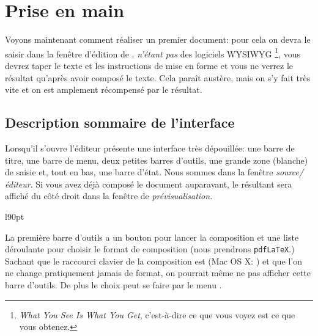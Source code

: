 
\chapter{Prise en main}
\label{chap:first-steps}

Voyons maintenant comment réaliser un premier document: pour cela on devra le saisir dans la fenêtre d'édition de \Tw{}. \AllTeX{} \emph{n'étant pas} des logiciels WYSIWYG \footnote{\emph{What You See Is What You Get}, c'est-à-dire \og ce que vous voyez est ce que vous obtenez\fg.}, vous devrez taper le texte et les instructions de mise en forme et vous ne verrez le résultat qu'après avoir \og composé\fg{} le texte. Cela paraît austère, mais on s'y fait très vite et on est amplement récompensé par le résultat.

\section{Description sommaire de l'interface}

\newsavebox{\inlineimg}

Lorsqu'il s'ouvre l'éditeur présente une interface très dépouillée: une barre de titre, une barre de menu, deux petites barres d'outils, une grande zone (blanche) de saisie et, tout en bas, une barre d'état. Nous sommes dans la fenêtre \emph{source/éditeur}. Si vous avez déjà composé le document auparavant, le  résultant sera affiché du côté droit dans la fenêtre de \emph{prévisualisation.}
\vspace{10pt}

\begin{wrapfigure}[2]{l}{90pt}
\vspace*{-1em}
\usebox{\inlineimg}
\end{wrapfigure}
\noindent La première barre d'outils a un bouton pour lancer la composition et une liste déroulante pour choisir le format de composition (nous prendrons \verb|pdfLaTeX|.) Sachant que le raccourci clavier de la composition est  (Mac OS X: ) et que l'on ne change pratiquement jamais de format, on pourrait même ne pas afficher cette barre d'outils. De plus le choix peut se faire par le menu .
\vspace{10pt}

